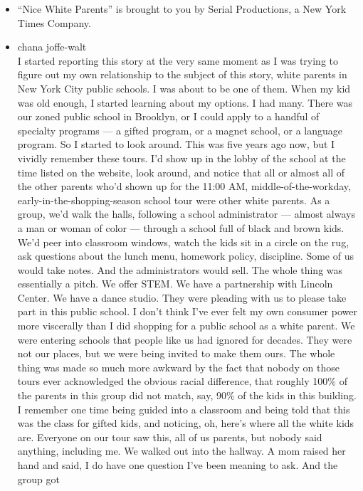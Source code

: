 \begin{itemize}
\item
  ``Nice White Parents'' is brought to you by Serial Productions, a New
  York Times Company.
\item
  chana joffe-walt\\
  I started reporting this story at the very same moment as I was trying
  to figure out my own relationship to the subject of this story, white
  parents in New York City public schools. I was about to be one of
  them. When my kid was old enough, I started learning about my options.
  I had many. There was our zoned public school in Brooklyn, or I could
  apply to a handful of specialty programs --- a gifted program, or a
  magnet school, or a language program. So I started to look around.
  This was five years ago now, but I vividly remember these tours. I'd
  show up in the lobby of the school at the time listed on the website,
  look around, and notice that all or almost all of the other parents
  who'd shown up for the 11:00 AM, middle-of-the-workday,
  early-in-the-shopping-season school tour were other white parents. As
  a group, we'd walk the halls, following a school administrator ---
  almost always a man or woman of color --- through a school full of
  black and brown kids. We'd peer into classroom windows, watch the kids
  sit in a circle on the rug, ask questions about the lunch menu,
  homework policy, discipline. Some of us would take notes. And the
  administrators would sell. The whole thing was essentially a pitch. We
  offer STEM. We have a partnership with Lincoln Center. We have a dance
  studio. They were pleading with us to please take part in this public
  school. I don't think I've ever felt my own consumer power more
  viscerally than I did shopping for a public school as a white parent.
  We were entering schools that people like us had ignored for decades.
  They were not our places, but we were being invited to make them ours.
  The whole thing was made so much more awkward by the fact that nobody
  on those tours ever acknowledged the obvious racial difference, that
  roughly 100\% of the parents in this group did not match, say, 90\% of
  the kids in this building. I remember one time being guided into a
  classroom and being told that this was the class for gifted kids, and
  noticing, oh, here's where all the white kids are. Everyone on our
  tour saw this, all of us parents, but nobody said anything, including
  me. We walked out into the hallway. A mom raised her hand and said, I
  do have one question I've been meaning to ask. And the group got

\end{itemize}
